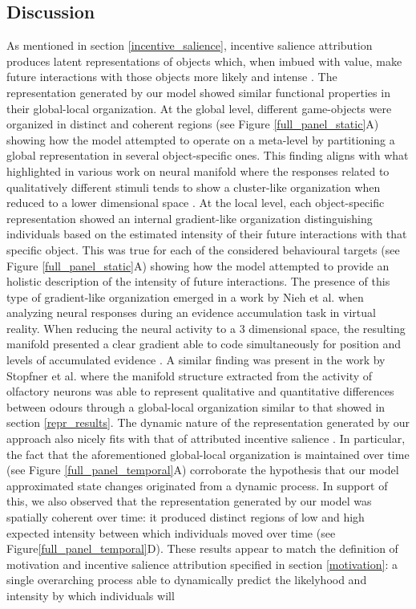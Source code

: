 \subsection{Discussion}
As mentioned in section  \ref{incentive_salience}, incentive salience attribution produces latent representations of objects which, when imbued with value, make future interactions with those objects more likely and intense \cite{berridge1998role,berridge2004motivation}. The representation generated by our model showed similar functional properties in their global-local organization. At the global level, different game-objects were organized in distinct and coherent regions (see Figure \ref{full_panel_static}A) showing how the model attempted to operate on a meta-level by partitioning a global representation in several object-specific ones. This finding aligns with what highlighted in various work on neural manifold where the responses related to qualitatively different stimuli tends to show a cluster-like organization when reduced to a lower dimensional space \cite{stopfer2003intensity, gallego2017neural, ganmor2015thesaurus}. At the local level, each object-specific representation showed an internal gradient-like organization distinguishing individuals based on the estimated intensity of their future interactions with that specific object. This was true for each of the considered behavioural targets (see Figure \ref{full_panel_static}A) showing how the model attempted to provide an holistic description of the intensity of future interactions. The presence of this type of gradient-like organization emerged in a work by Nieh et al. \cite{nieh2021geometry} when analyzing neural responses during an evidence accumulation task in virtual reality. When reducing the neural activity to a 3 dimensional space, the resulting manifold presented a clear gradient able to code simultaneously for position and levels of accumulated evidence \cite{nieh2021geometry}. A similar finding was present in the work by Stopfner et al. \cite{stopfer2003intensity} where the manifold structure extracted from the activity of olfactory neurons was able to represent qualitative and quantitative differences between odours through a global-local organization similar to that showed in section \ref{repr_results}. The dynamic nature of the representation generated by our approach also nicely fits with that of attributed incentive salience \cite{toates1994comparing,robinson1993neural,zhang2009neural,tindell2009dynamic,berridge2012prediction}. In particular, the fact that the aforementioned global-local organization is maintained over time (see Figure \ref{full_panel_temporal}A) corroborate the hypothesis that our model approximated state changes originated from a dynamic process. In support of this, we also observed that the representation generated by our model was spatially coherent over time: it produced distinct regions of low and high expected intensity between which individuals moved over time (see Figure\ref{full_panel_temporal}D). These results appear to match the definition of motivation and incentive salience attribution specified in section \ref{motivation}: a single overarching process able to dynamically predict the likelyhood and intensity by which individuals will 
